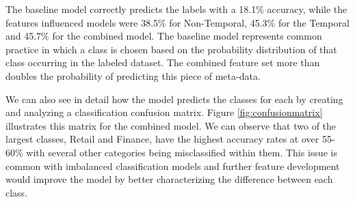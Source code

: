 The baseline model correctly predicts the labels with a 18.1\% accuracy, while the features influenced models were 38.5\% for Non-Temporal, 45.3\% for the Temporal and 45.7\% for the combined model.  The baseline model represents common practice in which a class is chosen based on the probability distribution of that class occurring in the labeled dataset. The combined feature set more than doubles the probability of predicting this piece of meta-data.

We can also see in detail how the model predicts the classes for each by creating and analyzing a classification confusion matrix. Figure \ref{fig:confusionmatrix} illustrates this matrix for the combined model. We can observe that two of the largest classes, Retail and Finance, have the highest accuracy rates at over 55-60\% with several other categories being misclassified within them.  This issue is common with imbalanced classification models and further feature development would improve the model by better characterizing the difference between each class.
